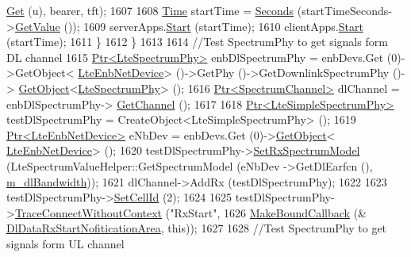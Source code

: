 \begin{DoxyCode}
      \hyperlink{classns3_1_1NetDeviceContainer_a677d62594b5c9d2dea155cc5045f4d0b}{Get} (u), bearer, tft);
1607 
1608           \hyperlink{classns3_1_1Time}{Time} startTime = \hyperlink{group__timecivil_ga33c34b816f8ff6628e33d5c8e9713b9e}{Seconds} (startTimeSeconds->\hyperlink{classns3_1_1UniformRandomVariable_a03822d8c86ac51e9aa83bbc73041386b}{GetValue} ());
1609           serverApps.\hyperlink{classns3_1_1ApplicationContainer_a8eff87926507020bbe3e1390358a54a7}{Start} (startTime);
1610           clientApps.\hyperlink{classns3_1_1ApplicationContainer_a8eff87926507020bbe3e1390358a54a7}{Start} (startTime);
1611         \}
1612     \}
1613 
1614   \textcolor{comment}{//Test SpectrumPhy to get signals form DL channel}
1615   \hyperlink{classns3_1_1Ptr}{Ptr<LteSpectrumPhy>} enbDlSpectrumPhy = enbDevs.Get (0)->GetObject<
      \hyperlink{classns3_1_1LteEnbNetDevice}{LteEnbNetDevice}> ()->GetPhy ()->GetDownlinkSpectrumPhy ()->
      \hyperlink{classns3_1_1Object_a13e18c00017096c8381eb651d5bd0783}{GetObject}<\hyperlink{classns3_1_1LteSpectrumPhy}{LteSpectrumPhy}> ();
1616   \hyperlink{classns3_1_1Ptr}{Ptr<SpectrumChannel>} dlChannel = enbDlSpectrumPhy->
      \hyperlink{classns3_1_1LteSpectrumPhy_a50f13e43568687ee32c5d63e5bf639c2}{GetChannel} ();
1617 
1618   \hyperlink{classns3_1_1Ptr}{Ptr<LteSimpleSpectrumPhy>} testDlSpectrumPhy = CreateObject<LteSimpleSpectrumPhy>
       ();
1619   \hyperlink{classns3_1_1Ptr}{Ptr<LteEnbNetDevice>} eNbDev = enbDevs.Get (0)->\hyperlink{classns3_1_1Object_a13e18c00017096c8381eb651d5bd0783}{GetObject}<
      \hyperlink{classns3_1_1LteEnbNetDevice}{LteEnbNetDevice}> ();
1620   testDlSpectrumPhy->\hyperlink{classns3_1_1LteSimpleSpectrumPhy_a1cbc14b5951a6c9360d3b180760429d9}{SetRxSpectrumModel} (LteSpectrumValueHelper::GetSpectrumModel (eNbDev
      ->GetDlEarfcn (), \hyperlink{classLteFrAreaTestCase_a645fc2cea287afbd373f6d702152cf47}{m\_dlBandwidth}));
1621   dlChannel->AddRx (testDlSpectrumPhy);
1622 
1623   testDlSpectrumPhy->\hyperlink{classns3_1_1LteSimpleSpectrumPhy_aed3e4883b1f03358a744746b08fbd5d8}{SetCellId} (2);
1624 
1625   testDlSpectrumPhy->\hyperlink{classns3_1_1ObjectBase_a1be45f6fd561e75dcac9dfa81b2b81e4}{TraceConnectWithoutContext} (\textcolor{stringliteral}{"RxStart"},
1626                                                  \hyperlink{group__makeboundcallback_ga1725d6362e6065faa0709f7c93f8d770}{MakeBoundCallback} (&
      \hyperlink{lte-test-frequency-reuse_8cc_a39fd51e5983e3a2105d2862729ad91e0}{DlDataRxStartNofiticationArea}, \textcolor{keyword}{this}));
1627 
1628   \textcolor{comment}{//Test SpectrumPhy to get signals form UL channel}

\end{DoxyCode}
